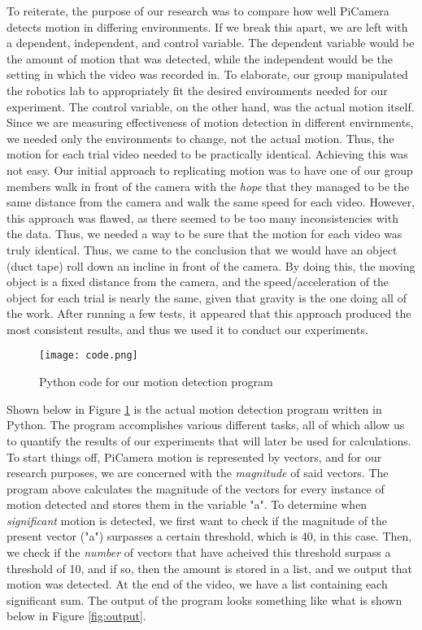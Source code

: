 \documentclass[sigsmall]{acmart}
\begin{document}
To reiterate, the purpose of our research was to compare how well PiCamera detects motion in differing environments.  If we break this apart, we are left with a dependent, independent, and control variable.  The dependent variable would be the amount of motion that was detected, while the independent would be the setting in which the video was recorded in.  To elaborate, our group manipulated the robotics lab to appropriately fit the desired environments needed for our experiment.  The control variable, on the other hand, was the actual motion itself.  Since we are measuring effectiveness of motion detection in different envirnments, we needed only the environments to change, not the actual motion.  Thus, the motion for each trial video needed to be practically identical.  Achieving this was not easy.  Our initial approach to replicating motion was to have one of our group members walk in front of the camera with the \emph{hope} that they managed to be the same distance from the camera and walk the same speed for each video.  However, this approach was flawed, as there seemed to be too many inconsistencies with the data.  Thus, we needed a way to be sure that the motion for each video was truly identical.  Thus, we came to the conclusion that we would have an object (duct tape) roll down an incline in front of the camera.  By doing this, the moving object is a fixed distance from the camera, and the speed/acceleration of the object for each trial is nearly the same, given that gravity is the one doing all of the work.  After running a few tests, it appeared that this approach produced the most consistent results, and thus we used it to conduct our experiments.

\begin{figure}[h!]
	\texttt{[image: code.png]}
	\caption{Python code for our motion detection program}
	\label{fig:code}
\end{figure}

Shown below in Figure \ref{fig:code} is the actual motion detection program written in Python.  The program accomplishes various different tasks, all of which allow us to quantify the results of our experiments that will later be used for calculations.  To start things off, PiCamera motion is represented by vectors, and for our research purposes, we are concerned with the \emph{magnitude} of said vectors.  The program above calculates the magnitude of the vectors for every instance of motion detected and stores them in the variable "a".  To determine when \emph{significant} motion is detected, we first want to check if the magnitude of the present vector ("a") surpasses a certain threshold, which is 40, in this case.  Then, we check if the \emph{number} of vectors that have acheived this threshold surpass a threshold of 10, and if so, then the amount is stored in a list, and we output that motion was detected.  At the end of the video, we have a list containing each significant sum.  The output of the program looks something like what is shown below in Figure \ref{fig:output}.
\end{document}
